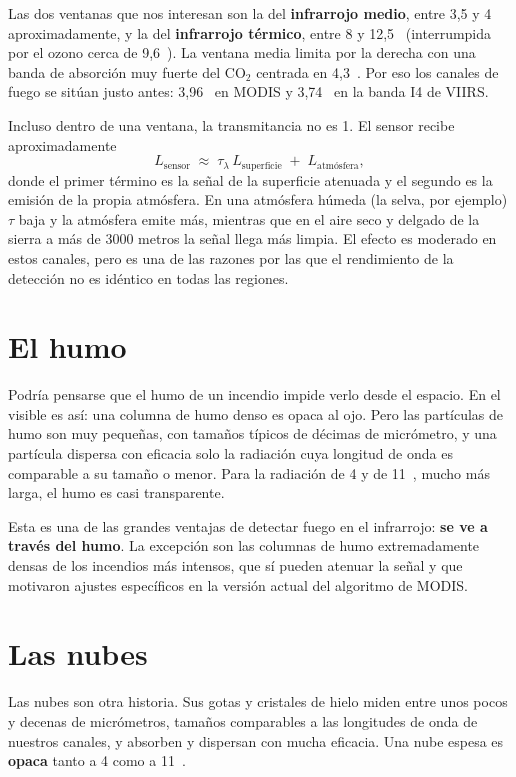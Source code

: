 Las dos ventanas que nos interesan son la del \textbf{infrarrojo medio}, entre 3,5 y 4~\um{}
aproximadamente, y la del \textbf{infrarrojo térmico}, entre 8 y 12,5~\um{} (interrumpida por
el ozono cerca de 9,6~\um). La ventana media limita por la derecha con una banda de absorción
muy fuerte del CO$_2$ centrada en 4,3~\um. Por eso los canales de fuego se sitúan justo antes:
3,96~\um{} en MODIS y 3,74~\um{} en la banda I4 de VIIRS.

Incluso dentro de una ventana, la transmitancia no es 1. El sensor recibe aproximadamente
\begin{equation}\label{eq:transferencia}
  L_{\text{sensor}} \;\approx\; \tau_\lambda\, L_{\text{superficie}} \;+\; L_{\text{atmósfera}},
\end{equation}
donde el primer término es la señal de la superficie atenuada y el segundo es la emisión de la
propia atmósfera. En una atmósfera húmeda (la selva, por ejemplo) $\tau$ baja y la atmósfera
emite más, mientras que en el aire seco y delgado de la sierra a más de 3000 metros la señal
llega más limpia. El efecto es moderado en estos canales, pero es una de las razones por las que
el rendimiento de la detección no es idéntico en todas las regiones.

\section{El humo}

Podría pensarse que el humo de un incendio impide verlo desde el espacio. En el visible es así:
una columna de humo denso es opaca al ojo. Pero las partículas de humo son muy pequeñas, con
tamaños típicos de décimas de micrómetro, y una partícula dispersa con eficacia solo la
radiación cuya longitud de onda es comparable a su tamaño o menor. Para la radiación de 4 y de
11~\um, mucho más larga, el humo es casi transparente.

Esta es una de las grandes ventajas de detectar fuego en el infrarrojo: \textbf{se ve a través
del humo}. La excepción son las columnas de humo extremadamente densas de los incendios más
intensos, que sí pueden atenuar la señal y que motivaron ajustes específicos en la versión
actual del algoritmo de MODIS.

\section{Las nubes}

Las nubes son otra historia. Sus gotas y cristales de hielo miden entre unos pocos y decenas de
micrómetros, tamaños comparables a las longitudes de onda de nuestros canales, y absorben y
dispersan con mucha eficacia. Una nube espesa es \textbf{opaca} tanto a 4 como a 11~\um.


